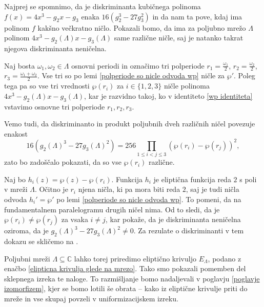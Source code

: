 \documentclass[mat1]{fmfdelo}
\numberwithin{equation}{section}
\newcommand{\C}{\mathbb C}
\newcommand{\om}{\omega}
\theoremstyle{definition}
\begin{document}
\begin{dokaz}
    Najprej se spomnimo, da je diskriminanta kubičnega polinoma $f(x) = 4x^3 - g_2 x - g_3$ enaka $16(g_2^3 - 27g_3^2)$ in da nam ta pove, kdaj ima polinom $f$ kakšno večkratno ničlo. Pokazali bomo, da ima za poljubno mrežo $\Lambda$ polinom $4x^3 - g_2(\Lambda) x - g_3(\Lambda)$ same različne ničle, saj je natanko takrat njegova diskriminanta neničelna.  

    Naj bosta $\om_1, \om_2 \in \Lambda$ osnovni periodi in označimo tri polperiode
    $ r_1 = \frac{\om_1}{2}$, $r_2 = \frac{\om_2}{2}$, $r_3 = \frac{\om_1 + \om_2}{2}$. Vse tri so po lemi \ref{polperiode so nicle odvoda wp} ničle za $\wp'$. Poleg tega pa so vse tri vrednosti $\wp(r_i)$ za $i \in \{1,2,3\}$ ničle polinoma $4x^3 - g_2(\Lambda) x - g_3(\Lambda)$, kar je razvidno takoj, ko v identiteto \eqref{wp identiteta} vstavimo osnovne tri polperiode $r_1, r_2, r_3$.
    
    Vemo tudi, da diskriminanto in produkt poljubnih dveh različnih ničel povezuje enakost 
    \[
        16(g_2(\Lambda)^3 - 27g_3(\Lambda)^2) = 256\prod_{1 \leq i < j \leq 3}(\wp(r_i) - \wp(r_j))^2,  
    \]
    zato bo zadoščalo pokazati, da so vse $\wp(r_i)$ različne.
    
    Naj bo $h_i(z) = \wp(z) - \wp(r_i)$. Funkcija $h_i$ je eliptična funkcija reda $2$ s poli v mreži $\Lambda$. Očitno je $r_i$ njena ničla, ki pa mora biti reda $2$, saj je tudi ničla odvoda $h_i' = \wp'$ po lemi \ref{polperiode so nicle odvoda wp}. To pomeni, da na fundamentalnem paralelogramu drugih ničel nima. Od to sledi, da je $\wp(r_i) \neq \wp(r_j)$ za vsaka $i \neq j$, kar pokaže, da je diskriminanta neničelna oziroma, da je $g_2(\Lambda)^3 - 27g_3(\Lambda)^2 \neq 0$. Za rezulate o diskriminanti v tem dokazu se skličemo na \cite{Diskriminanta}.  
\end{dokaz}

Poljubni mreži $\Lambda \subseteq \C$ lahko torej priredimo eliptično krivuljo $E_\Lambda$, podano z enačbo \eqref{elipticna krivulja glede na mrezo}. Tako smo pokazali pomemben del sklepnega izreka te naloge. To razmišljanje bomo nadaljevali v poglavju \ref{poglavje izomorfizem}, kjer se bomo lotili še obrata -- kako iz eliptične krivulje priti do mreže in vse skupaj povzeli v uniformizacijskem izreku.


\end{document}
